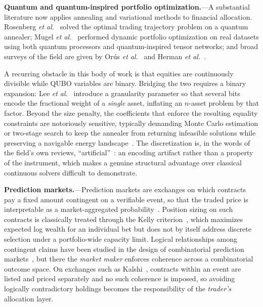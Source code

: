 \documentclass[aps, reprint, prl, twocolumn, superscriptaddress,amsmath,amssymb,noeprint]{revtex4-2}
\begin{document}
\textbf{Quantum and quantum-inspired portfolio optimization.}---A
substantial literature now applies annealing and variational methods to
financial allocation.  Rosenberg \textit{et al.}~\cite{rosenberg2016}
solved the optimal trading trajectory problem on a quantum annealer;
Mugel \textit{et al.}~\cite{mugel2022} performed dynamic portfolio
optimization on real datasets using both quantum processors and
quantum-inspired tensor networks; and broad surveys of the field are
given by Or\'{u}s \textit{et al.}~\cite{orus2019} and Herman \textit{et
al.}~\cite{herman2023}.

A recurring obstacle in this body of work is that equities are
continuously divisible while QUBO variables are binary.  Bridging the two
requires a binary expansion: Lee \textit{et al.}~\cite{lee2024} introduce
a granularity parameter so that several bits encode the fractional weight
of a \emph{single} asset, inflating an $n$-asset problem by that factor.
Beyond the size penalty, the coefficients that enforce the resulting
equality constraints are notoriously sensitive, typically demanding Monte
Carlo estimation or two-stage search to keep the annealer from returning
infeasible solutions while preserving a navigable energy
landscape~\cite{lee2024,verma2022}.  The discretization is, in the words
of the field's own reviews, ``artificial''~\cite{herman2023}: an encoding
artifact rather than a property of the instrument, which makes a genuine
structural advantage over classical continuous solvers difficult to
demonstrate.

\textbf{Prediction markets.}---Prediction markets are exchanges on which
contracts pay a fixed amount contingent on a verifiable event, so that
the traded price is interpretable as a market-aggregated
probability~\cite{wolfers2004,arrow2008}.  Position sizing on such
contracts is classically treated through the Kelly
criterion~\cite{kelly1956,thorp2006}, which maximizes expected log wealth
for an individual bet but does not by itself address discrete selection
under a portfolio-wide capacity limit.  Logical relationships among
contingent claims have been studied in the design of combinatorial
prediction markets~\cite{hanson2003,chen2007}, but there the
\emph{market maker} enforces coherence across a combinatorial outcome
space.  On exchanges such as Kalshi~\cite{kalshi}, contracts within an
event are listed and priced separately and no such coherence is imposed,
so avoiding logically contradictory holdings becomes the responsibility
of the \emph{trader's} allocation layer.
\end{document}

